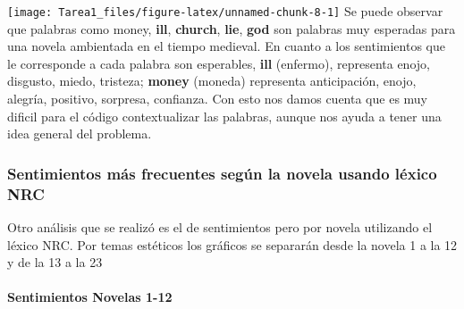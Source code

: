 \documentclass[
]{article}
\begin{document}
\texttt{[image: Tarea1\_files/figure-latex/unnamed-chunk-8-1]}
Se puede observar que palabras como money, \textbf{ill},
\textbf{church}, \textbf{lie}, \textbf{god} son palabras muy esperadas
para una novela ambientada en el tiempo medieval. En cuanto a los
sentimientos que le corresponde a cada palabra son esperables,
\textbf{ill} (enfermo), representa enojo, disgusto, miedo, tristeza;
\textbf{money} (moneda) representa anticipación, enojo, alegría,
positivo, sorpresa, confianza. Con esto nos damos cuenta que es muy
dificil para el código contextualizar las palabras, aunque nos ayuda a
tener una idea general del problema.

\hypertarget{sentimientos-muxe1s-frecuentes-seguxfan-la-novela-usando-luxe9xico-nrc}{%
\subsubsection{\texorpdfstring{\textbf{Sentimientos más frecuentes según
la novela usando léxico
NRC}}{Sentimientos más frecuentes según la novela usando léxico NRC}}\label{sentimientos-muxe1s-frecuentes-seguxfan-la-novela-usando-luxe9xico-nrc}}

Otro análisis que se realizó es el de sentimientos pero por novela
utilizando el léxico NRC. Por temas estéticos los gráficos se separarán
desde la novela 1 a la 12 y de la 13 a la 23

\hypertarget{sentimientos-novelas-1-12}{%
\paragraph{\texorpdfstring{\textbf{Sentimientos Novelas
1-12}}{Sentimientos Novelas 1-12}}\label{sentimientos-novelas-1-12}}
\end{document}
